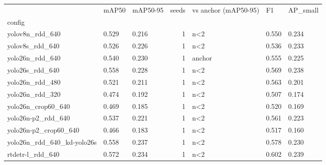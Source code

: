 \begin{tabular}{lllrlll}
\toprule
 & mAP50 & mAP50-95 & seeds & vs anchor (mAP50-95) & F1 & AP\_small \\
config &  &  &  &  &  &  \\
\midrule
yolov8n\_rdd\_640 & 0.529 & 0.216 & 1 & n<2 & 0.550 & 0.234 \\
yolov8s\_rdd\_640 & 0.526 & 0.226 & 1 & n<2 & 0.536 & 0.233 \\
yolo26n\_rdd\_640 & 0.540 & 0.230 & 1 & anchor & 0.555 & 0.225 \\
yolo26s\_rdd\_640 & 0.558 & 0.228 & 1 & n<2 & 0.569 & 0.238 \\
yolo26n\_rdd\_480 & 0.521 & 0.211 & 1 & n<2 & 0.563 & 0.201 \\
yolo26n\_rdd\_320 & 0.474 & 0.192 & 1 & n<2 & 0.507 & 0.174 \\
yolo26n\_crop60\_640 & 0.469 & 0.185 & 1 & n<2 & 0.520 & 0.169 \\
yolo26n-p2\_rdd\_640 & 0.537 & 0.221 & 1 & n<2 & 0.561 & 0.223 \\
yolo26n-p2\_crop60\_640 & 0.466 & 0.183 & 1 & n<2 & 0.517 & 0.160 \\
yolo26n\_rdd\_640\_kd-yolo26s & 0.558 & 0.237 & 1 & n<2 & 0.578 & 0.230 \\
rtdetr-l\_rdd\_640 & 0.572 & 0.234 & 1 & n<2 & 0.602 & 0.239 \\
\bottomrule
\end{tabular}
